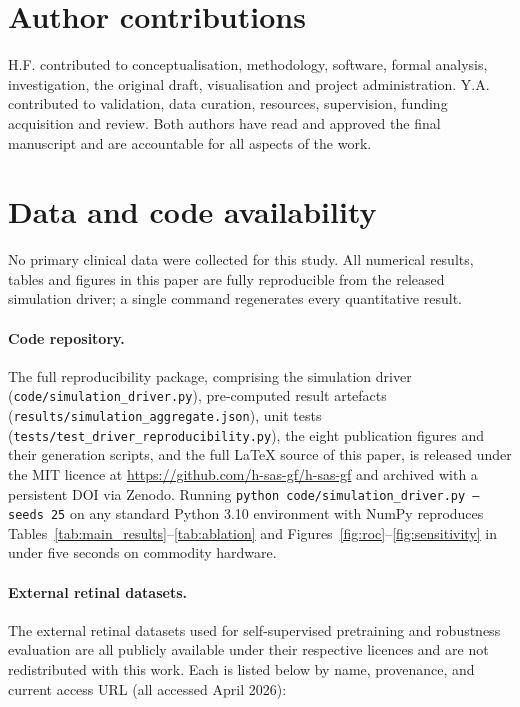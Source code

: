 \documentclass[twocolumn,10pt]{article}
\begin{document}
\section*{Author contributions}
H.F. contributed to conceptualisation, methodology, software,
formal analysis, investigation, the original draft, visualisation
and project administration. Y.A. contributed to validation, data
curation, resources, supervision, funding acquisition and review.
Both authors have read and approved the final manuscript and are
accountable for all aspects of the work.

\section*{Data and code availability}
No primary clinical data were collected for this study. All
numerical results, tables and figures in this paper are fully
reproducible from the released simulation driver; a single
command regenerates every quantitative result.

\paragraph{Code repository.}
The full reproducibility package, comprising the simulation
driver (\texttt{code/simulation\_driver.py}), pre-computed result
artefacts (\texttt{results/simulation\_aggregate.json}),
unit tests (\texttt{tests/test\_driver\_reproducibility.py}),
the eight publication figures and their generation scripts, and
the full \LaTeX{} source of this paper, is released under the MIT
licence at \url{https://github.com/h-sas-gf/h-sas-gf} and archived
with a persistent DOI via Zenodo. Running
\texttt{python\ code/simulation\_driver.py\ --seeds\ 25} on any
standard Python 3.10 environment with NumPy reproduces
Tables~\ref{tab:main_results}--\ref{tab:ablation} and
Figures~\ref{fig:roc}--\ref{fig:sensitivity} in under five seconds
on commodity hardware.

\paragraph{External retinal datasets.}
The external retinal datasets used for self-supervised
pretraining and robustness evaluation are all publicly available
under their respective licences and are not redistributed with
this work. Each is listed below by name, provenance, and current
access URL (all accessed April 2026):
\end{document}
